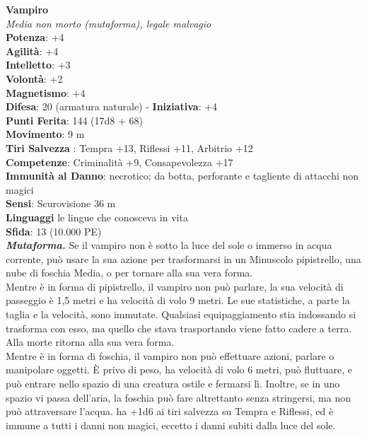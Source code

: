 \begin{multicols}{2}
\medskip\textbf{Vampiro}\\
\emph{Media non morto (mutaforma), legale malvagio}\\
\textbf{Potenza}: +4\\
\textbf{Agilità}: +4\\
\textbf{Intelletto}: +3\\
\textbf{Volontà}: +2\\
\textbf{Magnetismo}: +4\\
\textbf{Difesa}: 20 (armatura naturale) - \textbf{Iniziativa}: +4\\
\textbf{Punti Ferita}: 144 (17d8 + 68)\\
\textbf{Movimento}: 9 m\\
\textbf{Tiri Salvezza} : Tempra +13, Riflessi +11, Arbitrio +12\\
\textbf{Competenze}: Criminalità +9, Consapevolezza +17\\
\textbf{Immunità al Danno}: necrotico; da botta, perforante e tagliente di attacchi non magici\\
\textbf{Sensi}: Scurovisione 36 m\\
\textbf{Linguaggi} le lingue che conosceva in vita\\
\textbf{Sfida}: 13 (10.000 PE)\smallskip\\

\emph{\textbf{Mutaforma.}} Se il vampiro non è sotto la luce del sole o immerso in acqua corrente, può usare la sua azione per trasformarsi in un Minuscolo pipistrello, una nube di foschia Media, o per tornare alla sua vera forma.\\
Mentre è in forma di pipistrello, il vampiro non può parlare, la sua velocità di passeggio è 1,5 metri e ha velocità di volo 9 metri. Le sue statistiche, a parte la taglia e la velocità, sono immutate. Qualsiasi equipaggiamento stia indossando si trasforma con esso, ma quello che stava trasportando viene fatto cadere a terra. Alla morte ritorna alla sua vera forma.\\

Mentre è in forma di foschia, il vampiro non può effettuare azioni, parlare o manipolare oggetti. È privo di peso, ha velocità di volo 6 metri, può fluttuare, e può entrare nello spazio di una creatura ostile e fermarsi lì. Inoltre, se in uno spazio vi passa dell'aria, la foschia può fare altrettanto senza stringersi, ma non può attraversare l'acqua. ha +1d6 ai tiri salvezza su Tempra e Riflessi, ed è immune a tutti i danni non magici, eccetto i danni subiti dalla luce del sole.\\


\end{multicols}
